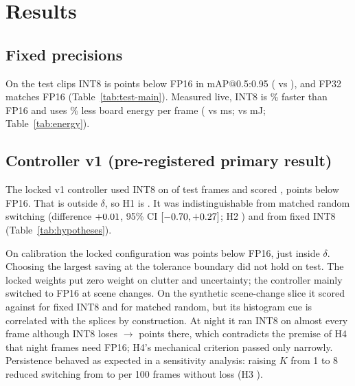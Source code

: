 \documentclass[pdflatex,sn-mathphys-num]{sn-jnl}
\begin{document}
\section{Results}\label{sec:results}

\subsection{Fixed precisions}
On the test clips INT8 is \DropINTeightVsFPsixteen{} points below FP16 in mAP@0.5:0.95 (\MapFixedINTeight{} vs \MapFixedFPsixteen{}), and FP32 matches FP16 (Table~\ref{tab:test-main}). Measured live, INT8 is \INTeightLatRedPct\% faster than FP16 and uses \INTeightETotalRedPct\% less board energy per frame (\LatINTeight{} vs \LatFPsixteen{} ms; \ETotalINTeight{} vs \ETotalFPsixteen{} mJ; Table~\ref{tab:energy}).



\subsection{Controller v1 (pre-registered primary result)}
The locked v1 controller used INT8 on \FracINTeightAdaptive{} of test frames and scored \MapAdaptive{}, \DropAdaptiveVsFPsixteen{} points below FP16. That is outside $\delta$, so H1 is \HOneResult{}. It was indistinguishable from matched random switching (difference $+0.01$, 95\% CI $[-0.70, +0.27]$; H2 \HTwoResult) and from fixed INT8 (Table~\ref{tab:hypotheses}).

On calibration the locked configuration was \CalibDropMain{} points below FP16, just inside $\delta$. Choosing the largest saving at the tolerance boundary did not hold on test. The locked weights put zero weight on clutter and uncertainty; the controller mainly switched to FP16 at scene changes. On the synthetic scene-change slice it scored \MapAdaptiveSceneChange{} against \MapFixedINTeightSceneChange{} for fixed INT8 and \MapRandomMatchedSceneChange{} for matched random, but its histogram cue is correlated with the splices by construction. At night it ran INT8 on almost every frame although INT8 loses \MapFixedFPsixteenNight{}$\to$\MapFixedINTeightNight{} points there, which contradicts the premise of H4 that night frames need FP16; H4's mechanical criterion passed only narrowly. Persistence behaved as expected in a sensitivity analysis: raising $K$ from 1 to 8 reduced switching from \SwitchRateKOne{} to \SwitchRateKEight{} per 100 frames without loss (H3 \HThreeResult).
\end{document}
